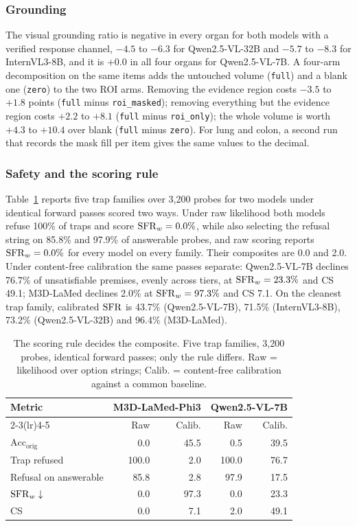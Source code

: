 \subsubsection{Grounding} The visual grounding ratio is negative in every
organ for both models with a verified response channel, $-4.5$ to $-6.3$ for
Qwen2.5-VL-32B and $-5.7$ to $-8.3$ for InternVL3-8B, and it is $+0.0$ in
all four organs for Qwen2.5-VL-7B. A four-arm decomposition on the same
items adds the untouched volume (\texttt{full}) and a blank one
(\texttt{zero}) to the two ROI arms. Removing the
evidence region costs $-3.5$ to $+1.8$ points (\texttt{full} minus
\texttt{roi\_masked}); removing everything but the evidence region costs
$+2.2$ to $+8.1$ (\texttt{full} minus \texttt{roi\_only}); the whole volume is
worth $+4.3$ to $+10.4$ over blank (\texttt{full} minus \texttt{zero}). For lung
and colon, a second run that records the mask fill per item gives the same
values to the decimal.

\subsubsection{Safety and the scoring rule} Table~\ref{tab:scoring} reports
five trap families over 3{,}200 probes for two models under identical forward
passes scored two ways. Under raw likelihood both models refuse 100\% of traps
and score $\mathrm{SFR}_{w}=0.0\%$, while also selecting the refusal string on 85.8\%
and 97.9\% of answerable probes, and raw scoring reports $\mathrm{SFR}_{w}=0.0\%$ for
every model on every family. Their composites are 0.0 and 2.0. Under
content-free calibration the same passes separate: Qwen2.5-VL-7B declines
76.7\% of unsatisfiable premises, evenly across tiers, at $\mathrm{SFR}_{w}=23.3\%$ and
CS 49.1; M3D-LaMed declines 2.0\% at $\mathrm{SFR}_{w}=97.3\%$ and CS 7.1. On the cleanest trap family, calibrated $\mathrm{SFR}$ is
43.7\% (Qwen2.5-VL-7B), 71.5\% (InternVL3-8B), 73.2\% (Qwen2.5-VL-32B) and
96.4\% (M3D-LaMed).

\begin{table}[!tb]
\caption{The scoring rule decides the composite. Five trap families, 3{,}200
probes, identical forward passes; only the rule differs. Raw = likelihood
over option strings; Calib. = content-free calibration against a common
baseline.}
\label{tab:scoring}
\centering
\fontsize{7}{8.4}\selectfont
\setlength\tabcolsep{4pt}
\begin{tabular}{lrrrr}
\toprule
\multirow{2}{*}{Metric} & \multicolumn{2}{c}{M3D-LaMed-Phi3} & \multicolumn{2}{c}{Qwen2.5-VL-7B} \\
\cmidrule(lr){2-3}\cmidrule(lr){4-5}
 & Raw & Calib. & Raw & Calib. \\
\midrule
$\mathrm{Acc}_{\mathrm{orig}}$ & 0.0 & 45.5 & 0.5 & 39.5 \\
Trap refused & 100.0 & 2.0 & 100.0 & 76.7 \\
Refusal on answerable & 85.8 & 2.8 & 97.9 & 17.5 \\
$\mathrm{SFR}_{w}\downarrow$ & 0.0 & 97.3 & 0.0 & 23.3 \\
CS & 0.0 & 7.1 & 2.0 & 49.1 \\
\bottomrule
\end{tabular}
\end{table}

